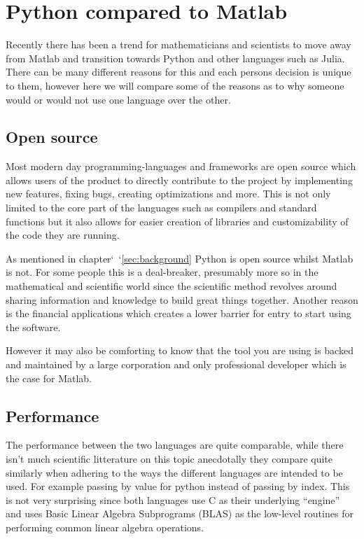 \documentclass{article}
\begin{document}
\section{Python compared to Matlab}%
\label{sec:pcm}
Recently there has been a trend for mathematicians and scientists to move away from Matlab and transition towards Python and other
languages such as Julia. There can be many different reasons for this and each persons decision is unique to them, however here we will
compare some of the reasons as to why someone would or would not use one language over the other.

\subsection{Open source}%
Most modern day programming-languages and frameworks are open source which allows users of the product to directly contribute to the
project by implementing new features, fixing bugs, creating optimizations and more. This is not only limited to the core part of the
languages such as compilers and standard functions but it also allows for easier creation of libraries and customizability of the code
they are running.

As mentioned in chapter`~`\ref{sec:background} Python is open source whilst Matlab is not. For some people this is a deal-breaker,
presumably more so in the mathematical and scientific world since the scientific method revolves around sharing information and knowledge
to build great things together. Another reason is the financial applications which creates a lower barrier for entry to start using the
software.

However it may also be comforting to know that the tool you are using is backed and maintained by a large corporation and only
professional developer which is the case for Matlab.

\subsection{Performance}%
The performance between the two languages are quite comparable, while there isn't much scientific litterature on this topic anecdotally
they compare quite similarly when adhering to the ways the different languages are intended to be used. For example passing by value for
python instead of passing by index. This is not very surprising since both languages use C as their underlying ``engine'' and uses Basic
Linear Algebra Subprograms (BLAS) as the low-level routines for performing common linear algebra operations.
\end{document}
